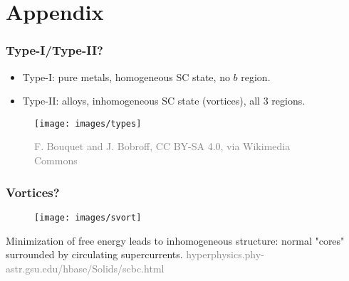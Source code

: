 \documentclass{beamer}
\begin{document}
	\section{Appendix}
		\begin{frame}
			\frametitle{Type-I/Type-II?}
			\begin{multicols}{2}
				\begin{itemize}
					\item Type-I: pure metals, homogeneous SC state, no $ b $ region.
					\item Type-II: alloys, inhomogeneous SC state (vortices), all 3 regions.
				\end{itemize}
				\columnbreak
				\begin{figure}
					\centering
					\texttt{[image: images/types]}
					\caption{\textcolor{gray}{\tiny F. Bouquet and J. Bobroff, CC BY-SA 4.0, via Wikimedia Commons}}
					\label{fig:types}
				\end{figure}
			\end{multicols}
		\end{frame}
		\begin{frame}
			\frametitle{Vortices?}
			\begin{figure}
				\centering
				\texttt{[image: images/svort]}
				\caption{}
				\label{fig:svort}
			\end{figure}\vspace{-20pt}
		Minimization of free energy leads to inhomogeneous structure: normal "cores" surrounded by circulating supercurrents. \tiny \textcolor{gray}{hyperphysics.phy-astr.gsu.edu/hbase/Solids/scbc.html}
		\end{frame}
	
\end{document}
